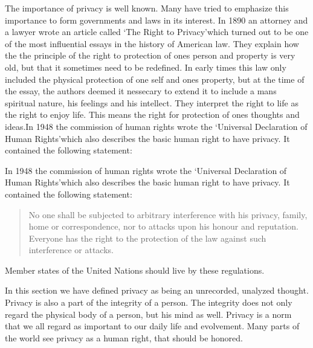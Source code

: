 The importance of privacy is well known. Many have tried to emphasize this importance to form governments and laws in its interest.
In 1890 an attorney and a lawyer wrote an article called  \lq The Right to Privacy\rq which turned out to be one of the most influential essays in the history of American law.\cite{website:the-right-to-privacy-info}
They explain how the the principle of the right to protection of ones person and property is very old, but that it sometimes need to be redefined. In early times this law only included the physical protection of one self and ones property, but at the time of the essay, the authors deemed it nessecary to extend it to include a mans spiritual nature, his feelings and his intellect. They interpret the right to life as the right to enjoy life. This means the right for protection of ones thoughts and ideas.In 1948 the commission of human rights wrote the \lq Universal Declaration of Human Rights\rq which also describes the basic human right to have privacy. It contained the following statement:

In 1948 the commission of human rights wrote the \lq Universal Declaration of Human Rights\rq which also describes the basic human right to have privacy. It contained the following statement:

\blockquote{No one shall be subjected to arbitrary interference with his privacy, family, home or correspondence, nor to attacks upon his honour and reputation. Everyone has the right to the protection of the law against such interference or attacks.\cite{website:un-human-rights}}

Member states of the United Nations should live by these regulations.


In this section we have defined privacy as being an unrecorded, unalyzed thought. Privacy is also a part of the integrity of a person. The integrity does not only regard the physical body of a person, but his mind as well.
Privacy is a norm that we all regard as important to our daily life and evolvement. Many parts of the world see privacy as a human right, that should be honored.
